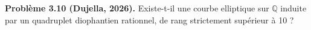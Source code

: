 \textbf{Problème 3.10 (Dujella, 2026).} Existe-t-il une courbe elliptique sur $\mathbb{Q}$ induite par un quadruplet diophantien rationnel, de rang strictement supérieur à 10 ?
